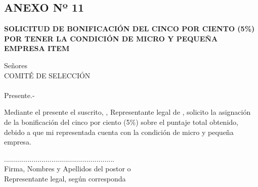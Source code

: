 \begin{center}
    \section*{ANEXO Nº 11 } 
    \textbf{SOLICITUD DE BONIFICACIÓN DEL CINCO POR CIENTO (5\%) POR TENER LA CONDICIÓN DE MICRO Y PEQUEÑA EMPRESA ITEM \objeto} 
    \end{center}
    
    Señores \\
    COMITÉ DE SELECCIÓN \\
    \nomenclatura \\
    Presente.-
    
    \vspace{0.5cm}
    
    Mediante el presente el suscrito, \representante, Representante legal de \empresa, solicito la asignación de la bonificación del cinco por ciento (5\%) sobre el puntaje total obtenido, debido a que mi representada cuenta con la condición de micro y pequeña empresa. 
    
    \vspace{0.5cm}
    
    \fecha 
    
    \vspace{2cm}
    
    \begin{center}
    ........................................................\\
    Firma, Nombres y Apellidos del postor o \\ 
    Representante legal, según corresponda
    
    \end{center}